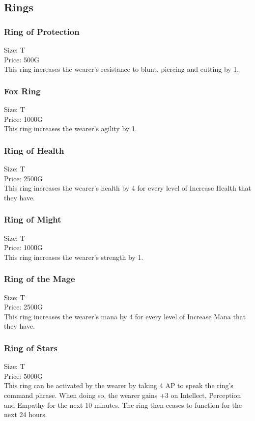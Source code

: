 \subsection{Rings}\label{subsec:rings}

\subsubsection{Ring of Protection}
Size: T\\
Price: 500G\\
This ring increases the wearer's resistance to blunt, piercing and cutting by 1.

\subsubsection{Fox Ring}
Size: T\\
Price: 1000G\\
This ring increases the wearer's agility by 1.

\subsubsection{Ring of Health}
Size: T\\
Price: 2500G\\
This ring increases the wearer's health by 4 for every level of Increase Health that they have.

\subsubsection{Ring of Might}
Size: T\\
Price: 1000G\\
This ring increases the wearer's strength by 1.

\subsubsection{Ring of the Mage}
Size: T\\
Price: 2500G\\
This ring increases the wearer's mana by 4 for every level of Increase Mana that they have.

\subsubsection{Ring of Stars}
Size: T\\
Price: 5000G\\
This ring can be activated by the wearer by taking 4 AP to speak the ring's command phrase.
When doing so, the wearer gains +3 on Intellect, Perception and Empathy for the next 10 minutes.
The ring then ceases to function for the next 24 hours.